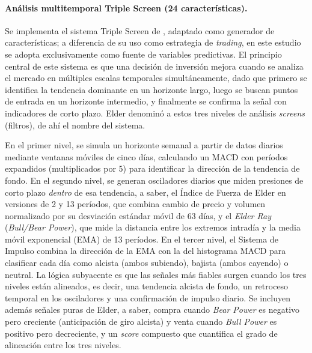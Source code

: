 \paragraph{An\'alisis multitemporal Triple Screen (24 caracter\'isticas).}
Se implementa el sistema Triple Screen de \citet{elder1993}, adaptado como generador de caracter\'isticas; a diferencia de su uso como estrategia de \textit{trading}, en este estudio se adopta exclusivamente como fuente de variables predictivas. El principio central de este sistema es que una decisi\'on de inversi\'on mejora cuando se analiza el mercado en m\'ultiples escalas temporales simult\'aneamente, dado que primero se identifica la tendencia dominante en un horizonte largo, luego se buscan puntos de entrada en un horizonte intermedio, y finalmente se confirma la se\~nal con indicadores de corto plazo. Elder denomin\'o a estos tres niveles de an\'alisis \textit{screens} (filtros), de ah\'i el nombre del sistema.

En el primer nivel, se simula un horizonte semanal a partir de datos diarios mediante ventanas m\'oviles de cinco d\'ias, calculando un MACD con per\'iodos expandidos (multiplicados por 5) para identificar la direcci\'on de la tendencia de fondo. En el segundo nivel, se generan osciladores diarios que miden presiones de corto plazo \textit{dentro} de esa tendencia, a saber, el \'Indice de Fuerza de Elder en versiones de 2 y 13 per\'iodos, que combina cambio de precio y volumen normalizado por su desviaci\'on est\'andar m\'ovil de 63 d\'ias, y el \textit{Elder Ray} (\textit{Bull/Bear Power}), que mide la distancia entre los extremos intrad\'ia y la media m\'ovil exponencial (EMA) de 13 per\'iodos. En el tercer nivel, el Sistema de Impulso combina la direcci\'on de la EMA con la del histograma MACD para clasificar cada d\'ia como alcista (ambos subiendo), bajista (ambos cayendo) o neutral. La l\'ogica subyacente es que las se\~nales m\'as fiables surgen cuando los tres niveles est\'an alineados, es decir, una tendencia alcista de fondo, un retroceso temporal en los osciladores y una confirmaci\'on de impulso diario. Se incluyen adem\'as se\~nales puras de Elder, a saber, compra cuando \textit{Bear Power} es negativo pero creciente (anticipaci\'on de giro alcista) y venta cuando \textit{Bull Power} es positivo pero decreciente, y un \textit{score} compuesto que cuantifica el grado de alineaci\'on entre los tres niveles.

